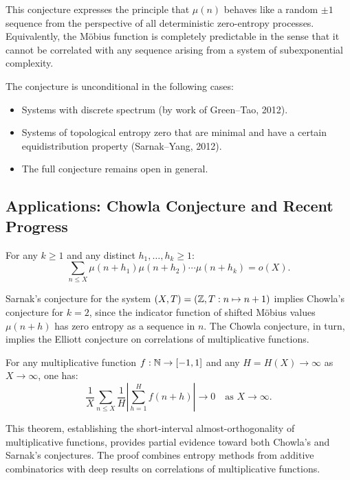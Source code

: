This conjecture expresses the principle that $\mu(n)$ behaves like a random $\pm 1$ sequence from the perspective of all deterministic zero-entropy processes. Equivalently, the M\"obius function is completely predictable in the sense that it cannot be correlated with any sequence arising from a system of subexponential complexity.

\begin{remark}
The conjecture is unconditional in the following cases:
\begin{itemize}
    \item Systems with discrete spectrum (by work of Green--Tao, 2012).
    \item Systems of topological entropy zero that are minimal and have a certain equidistribution property (Sarnak--Yang, 2012).
    \item The full conjecture remains open in general.
\end{itemize}
\end{remark}

\subsection{Applications: Chowla Conjecture and Recent Progress}

\begin{conjecture}[Chowla, 1965]
For any $k \geq 1$ and any distinct $h_1, \ldots, h_k \geq 1$:
\[
\sum_{n \leq X} \mu(n + h_1) \mu(n + h_2) \cdots \mu(n + h_k) = o(X).
\]
\end{conjecture}

Sarnak's conjecture for the system $(X, T) = (\mathbb{Z}, T: n \mapsto n+1)$ implies Chowla's conjecture for $k = 2$, since the indicator function of shifted M\"obius values $\mu(n+h)$ has zero entropy as a sequence in $n$. The Chowla conjecture, in turn, implies the Elliott conjecture on correlations of multiplicative functions.

\begin{theorem}
For any multiplicative function $f: \mathbb{N} \to [-1, 1]$ and any $H = H(X) \to \infty$ as $X \to \infty$, one has:
\[
\frac{1}{X} \sum_{n \leq X} \frac{1}{H} \left| \sum_{h=1}^{H} f(n+h) \right| \to 0 \quad \text{as } X \to \infty.
\]
\end{theorem}

This theorem, establishing the short-interval almost-orthogonality of multiplicative functions, provides partial evidence toward both Chowla's and Sarnak's conjectures. The proof combines entropy methods from additive combinatorics with deep results on correlations of multiplicative functions.

